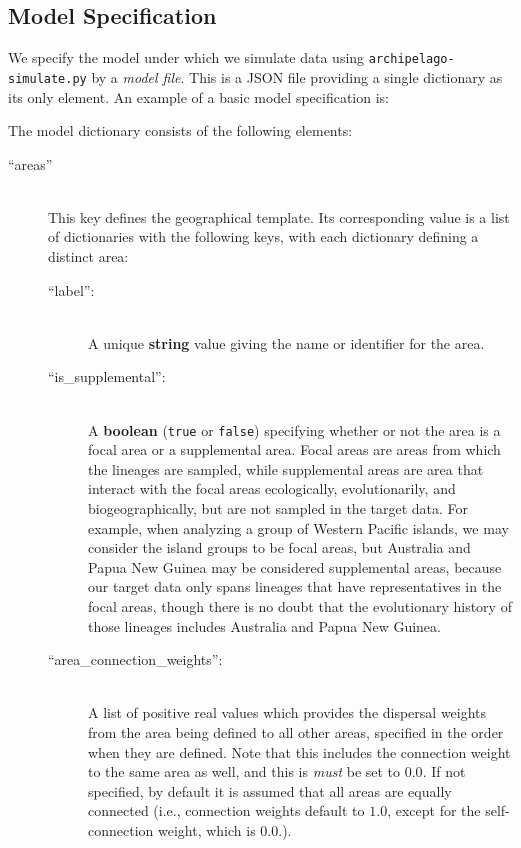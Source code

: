 \documentclass[11pt,openany]{memoir} %
\begin{document}
\subsection{Model Specification}
\label{sec:model-specification}
We specify the model under which we simulate data using \texttt{archipelago-simulate.py} by a \textit{model file}.
This is a JSON file providing a single dictionary as its only element.
An example of a basic model specification is:
% 

The model dictionary consists of the following elements:
\begin{description}

    \item[``areas'']  \hfill \\
        This key defines the geographical template.
        Its corresponding value is a list of dictionaries with the following keys, with each dictionary defining a distinct area:
        \begin{description}
            \item[``label'':] \hfill \\
                A unique \textbf{string} value giving the name or identifier for the area.
            \item[``is\_supplemental'':] \hfill \\
                A \textbf{boolean} (\texttt{true} or \texttt{false}) specifying whether or not the area is a focal area or a supplemental area.
                Focal areas are areas from which the lineages are sampled, while supplemental areas are area that interact with the focal areas ecologically, evolutionarily, and biogeographically, but are not sampled in the target data.
                For example, when analyzing a group of Western Pacific islands, we may consider the island groups to be focal areas, but Australia and Papua New Guinea may be considered supplemental areas, because our target data only spans lineages that have representatives in the focal areas, though there is no doubt that the evolutionary history of those lineages includes Australia and Papua New Guinea.
            \item[``area\_connection\_weights'':] \hfill \\
                A list of positive real values which provides the dispersal weights from the area being defined to all other areas, specified in the order when they are defined.
                Note that this includes the connection weight to the same area as well, and this is \textit{must} be set to $0.0$.
                If not specified, by default it is assumed that all areas are equally connected (i.e., connection weights default to $1.0$, except for the self-connection weight, which is $0.0$.).
        \end{description}


\end{description}
\end{document}
